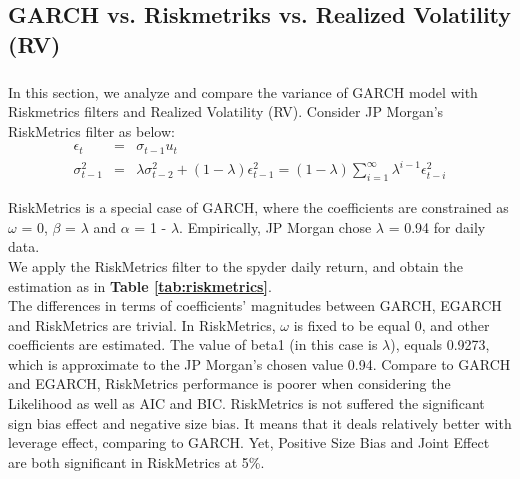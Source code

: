 \documentclass[a4paper]{article}
\begin{document}
\subsection{GARCH vs. Riskmetriks vs. Realized Volatility (RV)}
\subparagraph*{}
In this section, we analyze and compare the variance of GARCH model with Riskmetrics filters and Realized Volatility (RV). Consider JP Morgan's RiskMetrics filter as below:
\begin{eqnarray*}
\epsilon_t &=& \sigma_{t-1} u_t \\
\sigma_{t-1}^2 &=& \lambda \sigma_{t-2}^2  + (1 - \lambda) \epsilon_{t-1}^2 = (1 - \lambda) \sum^\infty_{i=1} \lambda^{i-1} \epsilon_{t-i}^2
\end{eqnarray*}


RiskMetrics is a special case of GARCH, where the coefficients are constrained as $\omega$ = 0, $\beta$ = $\lambda$ and $\alpha$ = 1 - $\lambda$. Empirically, JP Morgan chose $\lambda$ = 0.94 for daily data. \\
We apply the RiskMetrics filter to the spyder daily return, and obtain the estimation as in \textbf{Table \ref{tab:riskmetrics}}.\\

The differences in terms of coefficients' magnitudes between GARCH, EGARCH and RiskMetrics are trivial. In RiskMetrics, $\omega$ is fixed to be equal 0, and other coefficients are estimated. The value of beta1 (in this case is $\lambda$), equals 0.9273, which is approximate to the JP Morgan's chosen value 0.94. Compare to GARCH and EGARCH, RiskMetrics performance is poorer when considering the Likelihood as well as AIC and BIC. RiskMetrics is not suffered the significant sign bias effect and negative size bias. It means that it deals relatively better with leverage effect, comparing to GARCH. Yet, Positive Size Bias and Joint Effect are both significant in RiskMetrics at 5\%.\\



\end{document}

